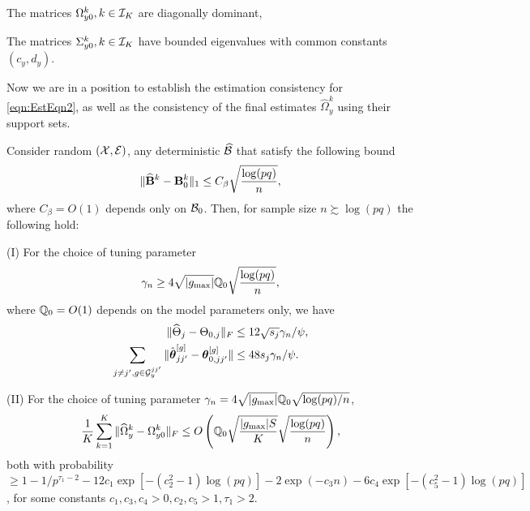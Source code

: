 \vspace{1em}
 The matrices $\Omega_{y0}^k, k \in {\cal{I}}_K$ are diagonally dominant,

 The matrices $\Sigma_{y0}^k, k \in {\cal{I}}_K$ have bounded eigenvalues with common constants $(c_y, d_y)$.
\vspace{1em}
%

\noindent Now we are in a position to establish the estimation consistency for \eqref{eqn:EstEqn2}, as well as the consistency of the final estimates $\widehat \Omega_y^k$ using their support sets.

\begin{Theorem}\label{thm:thm-Theta}
Consider random $({\cal{X}}, {\cal{E}})$, any deterministic $\widehat {{\cal{B}}}$ that satisfy the following bound
%
$$
\| \widehat {{\mathbf{B}}}^k - {\mathbf{B}}_0^k \|_1 \leq C_\beta \sqrt{ \frac{ \log(pq)}{n}},
$$
%
where $C_\beta = O(1)$ depends only on ${\cal{B}}_0$. Then, for sample size $n \succsim \log (pq)$ the following hold:

\noindent (I) For the choice of tuning parameter
%
$$
\gamma_n \geq 4 \sqrt{| g_{\max}|} {\mathbb{Q}}_0 \sqrt {\frac{ \log (p q)}{n}},
$$
%
where ${\mathbb{Q}}_0 = O(1)$ depends on the model parameters only, we have
%
\begin{align}
\| \widehat \Theta_j - \Theta_{0,j} \|_F & \leq 12 \sqrt{s_j} \gamma_n / \psi, \label{eqn:theta-norm-bound-1}\\
\sum_{j \neq j', g \in {\cal{G}}_y^{jj'}} \| \hat {{\boldsymbol{\theta}}}_{jj'}^{[g]} - {\boldsymbol{\theta}}_{0,jj'}^{[g]} \| & \leq 48 s_j \gamma_n / \psi. \label{eqn:theta-norm-bound-2}
\end{align}
%

\noindent (II) For the choice of tuning parameter $\gamma_n = 4 \sqrt{| g_{\max}|} {\mathbb{Q}}_0 \sqrt{\log (p q)/n}$,
%
\begin{align}\label{eqn:OmegaBounds0}
\frac{1}{K} \sum_{k=1}^K \| \widehat \Omega_y^k - \Omega_{y0}^k \|_F \leq
O \left( {\mathbb{Q}}_0 \sqrt{\frac{| g_{\max}| S}{K}} 
\sqrt {\frac{ \log (p q)}{n}} \right),
\end{align}
%
both with probability $\geq 1 - 1/p^{\tau_1-2} - 12 c_1 \exp [-(c_2^2-1) \log(pq)] - 2 \exp (- c_3 n) - 6c_4 \exp [-(c_5^2-1) \log(pq)]$, for some constants $c_1, c_3, c_4 > 0, c_2, c_5 > 1, \tau_1 > 2$.
\end{Theorem}


